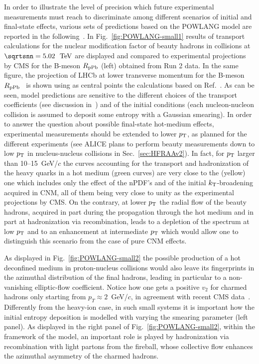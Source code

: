 In order to illustrate the level of precision which future experimental measurements must reach to discriminate among different scenarios of initial and final-state effects, various sets of predictions based on the POWLANG model are reported in the following~\cite{Beraudo:2015wsd}.
In Fig.~\ref{fig:POWLANG-small1} results of transport calculations for the nuclear modification factor of beauty hadrons in \pPb collisions at $\sqrtsnn=5.02~\UTeV$  are displayed and compared to experimental projections by CMS for the B-meson $R_{\rm pPb}$ (left) obtained from Run 2 data. In the same figure, the projection of LHCb at lower transverse momentum for the  B-meson $R_{\rm pPb}$~\cite{LHCb-CONF-2018-005} is shown using as central points the calculations based on Ref.~\cite{Kusina:2017gkz}. As can be seen, model predictions are sensitive to the different choices of the transport coefficients (see discussion in~\cite{Beraudo:2015wsd}) and of the initial conditions (each nucleon-nucleon collision is assumed to deposit some entropy with a Gaussian smearing). In order to answer the question about possible final-state hot-medium effects, experimental measurements should be extended to lower $p\sb{\scriptstyle\mathrm{T}}$, as planned for the different experiments (see ALICE plans to perform beauty measurements down to low $p\sb{\scriptstyle\mathrm{T}}$ in nucleus-nucleus collisions in Sec.~\ref{sec:HFRAAv2}). In fact, for $p\sb{\scriptstyle\mathrm{T}}$ larger than 10--15~GeV/$c$ the curves accounting for the transport and hadronization of the heavy quarks in a hot medium (green curves) are very close to the (yellow) one which includes only the effect of the nPDF's and of the initial $k_{\rm T}$-broadening acquired in CNM, all of them being very close to unity as the experimental projections by CMS. On the contrary, at lower $p\sb{\scriptstyle\mathrm{T}}$ the radial flow of the beauty hadrons, acquired in part during the propagation through the hot medium and in part at hadronization via recombination, leads to a depletion of the spectrum at low $p\sb{\scriptstyle\mathrm{T}}$ and to an enhancement at intermediate $p\sb{\scriptstyle\mathrm{T}}$ which would allow one to distinguish this scenario from the case of pure CNM effects. 

As displayed in Fig.~\ref{fig:POWLANG-small2} the possible production of a hot deconfined medium in proton-nucleus collisions would also leave its fingerprints in the azimuthal distribution of the final hadrons, leading in particular to a non-vanishing elliptic-flow coefficient. Notice how one gets a positive $v_2$ for charmed hadrons only starting from $p_T\!\approx\!2$~GeV/$c$, in agreement with recent CMS data~\cite{Sirunyan:2018toe}. Differently from the heavy-ion case, in such small systems it is important how the initial entropy deposition is modelled with varying the smearing parameter (left panel). As displayed in the right panel of Fig.~\ref{fig:POWLANG-small2}, within the framework of the model, an important role is played by hadronization via recombination with light partons from the fireball, whose collective flow enhances the azimuthal asymmetry of the charmed hadrons.

